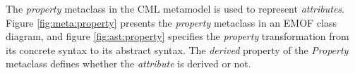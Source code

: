 \begin{abstract-syntax}
The \emph{property} metaclass in the CML metamodel is used to represent
\emph{attributes}.
Figure \ref{fig:meta:property} presents the \emph{property} metaclass
in an EMOF \cite{mof} class diagram,
and figure \ref{fig:ast:property} specifies
the \emph{property} transformation
from its concrete syntax to its abstract syntax.
The \emph{derived} property of the \emph{Property} metaclass
defines whether the \emph{attribute} is derived or not.
\end{abstract-syntax}

